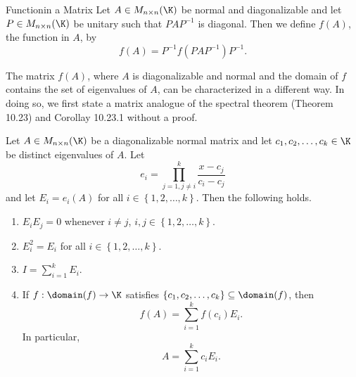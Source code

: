 \documentclass[linearalgebra]{subfiles}
\begin{document}
    \begin{definition}{Function}{in a Matrix}
        Let $A\in M_{n\times n}(\K)$ be normal and diagonalizable and let $P\in M_{n\times n}(\K)$ be unitary such that $PAP^{-1}$ is diagonal. Then we define $f(A)$, the function in $A$, by
        \begin{equation*}
            f(A) = P^{-1}f\left( PAP^{-1} \right) P^{-1}.
        \end{equation*}
    \end{definition}

    \begin{remark}
        The matrix $f(A)$, where $A$ is diagonalizable and normal and the domain of $f$ contains the set of eigenvalues of $A$, can be characterized in a different way. In doing so, we first state a matrix analogue of the spectral theorem (Theorem 10.23) and Corollay 10.23.1 without a proof.
    \end{remark}

    \clearpage
    \begin{prop}{}
        Let $A\in M_{n\times n}(\K)$ be a diagonalizable normal matrix and let $c_1,c_2,\ldots,c_k\in\K$ be distinct eigenvalues of $A$. Let
        \begin{equation*}
            e_i = \prod^{k}_{j=1,j\neq i} \frac{x-c_j}{c_i-c_j}
        \end{equation*}
        and let $E_i = e_i(A)$ for all $i\in\left\lbrace 1,2,\ldots,k \right\rbrace$. Then the following holds.
        \begin{enumerate}
            \item $E_iE_j = 0$ whenever $i\neq j$, $i,j\in\left\lbrace 1,2,\ldots,k \right\rbrace$.
            \item $E_i^2 = E_i$ for all $i\in\left\lbrace 1,2,\ldots,k \right\rbrace$.
            \item $I = \sum^{k}_{i=1} E_i$.
            \item If $f:\domain(f)\to\K$ satisfies $\left\lbrace c_1,c_2,\ldots,c_k \right\rbrace\subseteq\domain(f)$, then
                \begin{equation*}
                    f(A) = \sum^{k}_{i=1} f\left( c_i \right) E_i.
                \end{equation*}
                In particular,
                \begin{equation*}
                    A = \sum^{k}_{i=1} c_iE_i.
                \end{equation*}
        \end{enumerate}
    \end{prop}
\end{document}
